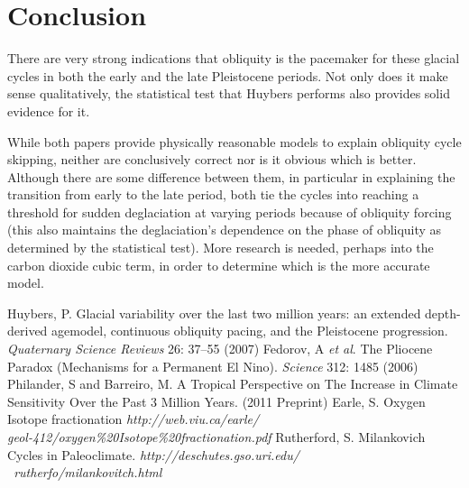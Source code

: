 \documentclass[11pt]{article}
\begin{document}
\section{Conclusion}
There are very strong indications that obliquity is the pacemaker for these glacial cycles in both the early and the late Pleistocene periods.
Not only does it make sense qualitatively, the statistical test that Huybers performs also provides solid evidence for it.

While both papers provide physically reasonable models to explain obliquity cycle skipping, neither are conclusively correct nor is it obvious which is better.
Although there are some difference between them, in particular in explaining the transition from early to the late period, both tie the cycles into reaching a threshold for sudden deglaciation at varying periods because of obliquity forcing (this also maintains the deglaciation's dependence on the phase of obliquity as determined by the statistical test).
More research is needed, perhaps into the carbon dioxide cubic term, in order to determine which is the more accurate model.

\begin{thebibliography}{9}
		Huybers, P. Glacial variability over the last two million years: an extended depth-derived agemodel, continuous obliquity pacing, and the Pleistocene progression. \emph{Quaternary Science Reviews} 26: 37--55 (2007)
		Fedorov, A \emph{et al}. The Pliocene Paradox (Mechanisms for a Permanent El Nino). \emph{Science} 312: 1485 (2006)
        Philander, S and Barreiro, M. A Tropical Perspective on The Increase in Climate Sensitivity Over the Past 3 Million Years. (2011 Preprint)
		Earle, S. Oxygen Isotope fractionation \emph{http://web.viu.ca/earle/\\geol-412/oxygen\%20Isotope\%20fractionation.pdf}
        Rutherford, S. Milankovich Cycles in Paleoclimate. \emph{http://deschutes.gso.uri.edu/\\~rutherfo/milankovitch.html}
\end{thebibliography}
\end{document}

